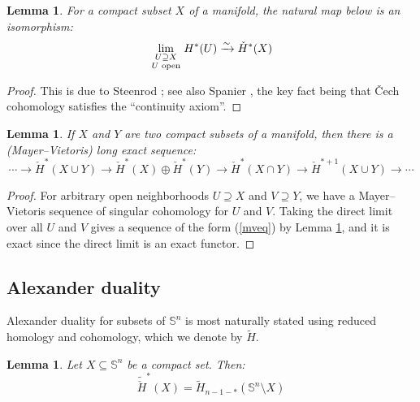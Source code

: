 \documentclass[12pt]{article}
\theoremstyle{plain}
\newtheorem{lemma}[theorem]{Lemma}
\theoremstyle{definition}
\theoremstyle{remark}
\numberwithin{equation}{section}
\begin{document}
\begin{lemma}\label{continuityaxiom}
For a compact subset $X$ of a manifold, the natural map below is an isomorphism:
\begin{equation}\label{cechdirectlimit}
\lim_{\begin{smallmatrix}U\supseteq X\cr U\text{ open}\end{smallmatrix}}H^\ast(U)\xrightarrow\sim\check H^\ast(X)
\end{equation}
\end{lemma}

\begin{proof}
This is due to Steenrod \cite{steenrod}; see also Spanier \cite[p419]{spanier}, the key fact being that \v Cech cohomology satisfies the ``continuity axiom''.
\end{proof}

\begin{lemma}\label{mayervietoris}
If $X$ and $Y$ are two compact subsets of a manifold, then there is a (Mayer--Vietoris) long exact sequence:
\begin{equation}\label{mveq}
\cdots\to\check H^\ast(X\cup Y)\to\check H^\ast(X)\oplus\check H^\ast(Y)\to\check H^\ast(X\cap Y)\to\check H^{\ast+1}(X\cup Y)\to\cdots
\end{equation}
\end{lemma}

\begin{proof}
For arbitrary open neighborhoods $U\supseteq X$ and $V\supseteq Y$, we have a Mayer--Vietoris sequence of singular cohomology for $U$ and $V$.  Taking the direct limit over all $U$ and $V$ gives a sequence of the form (\ref{mveq}) by Lemma \ref{continuityaxiom}, and it is exact since the direct limit is an exact functor.
\end{proof}

\subsection{Alexander duality}

Alexander duality for subsets of $\mathbb S^n$ is most naturally stated using reduced homology and cohomology, which we denote by $\tilde H$.

\begin{lemma}\label{alexanderduality}
Let $X\subseteq\mathbb S^n$ be a compact set.  Then:
\begin{equation}\label{alexdualeq}
\tilde{\check H}^\ast(X)=\tilde H_{n-1-\ast}(\mathbb S^n\setminus X)
\end{equation}
\end{lemma}
\end{document}
